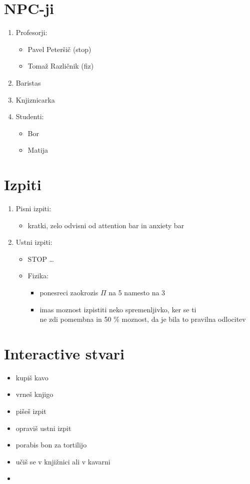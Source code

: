 \documentclass[a4paper]{article}
\begin{document}
\section{NPC-ji}
\begin{enumerate}
    \item Profesorji: \begin{itemize}
        \item Pavel Peteršič (stop)
        \item Tomaž Različnik (fiz)
    \end{itemize}
    \item Baristas
    \item Knjiznicarka
    \item Studenti: \begin{itemize}
        \item Bor
        \item Matija
    \end{itemize}
\end{enumerate}

\section{Izpiti}
\begin{enumerate}
    \item Pisni izpiti: \begin{itemize}
        \item kratki, zelo odvisni od attention bar in anxiety bar
    \end{itemize}

    \item Ustni izpiti: \begin{itemize}
        \item STOP\: \ldots
        \item Fizika: \begin{itemize}
            \item ponesreci zaokrozis $\Pi$ na 5 namesto na 3
            \item imas moznost izpistiti neko spremenljivko, ker se ti\\
            ne zdi pomembna in 50 \% moznost, da je bila to pravilna odlocitev
        \end{itemize}
    \end{itemize}
\end{enumerate}

\section{Interactive stvari}
\begin{itemize}
    \item kupiš kavo
    \item vrneš knjigo
    \item pišeš izpit
    \item opraviš ustni izpit
    \item porabis bon za tortilijo
    \item učiš se v knjižnici ali v kavarni
    \item 
\end{itemize}
\end{document}
